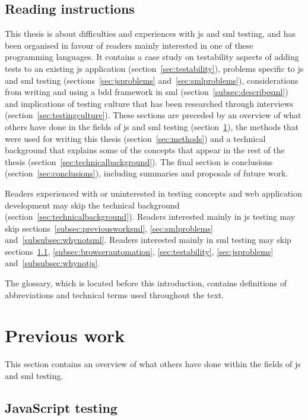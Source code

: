 \documentclass[11pt]{article}
\begin{document}
\subsection{Reading instructions}

This thesis is about difficulties and experiences with \gls{js} and \gls{sml} testing, and has been organised in favour of readers mainly interested in one of these programming languages. It contains a case study on testability aspects of adding tests to an existing \gls{js} application (section~\ref{sec:testability}), problems specific to \gls{js} and \gls{sml} testing (sections~\ref{sec:jsproblems} and~\ref{sec:smlproblems}), considerations from writing and using a \gls{bdd} framework in \gls{sml} (section~\ref{subsec:describesml}) and implications of testing culture that has been researched through interviews (section~\ref{sec:testingculture}). These sections are preceded by an overview of what others have done in the fields of \gls{js} and \gls{sml} testing (section~\ref{sec:previouswork}), the methods that were used for writing this thesis (section~\ref{sec:methods}) and a technical background that explains some of the concepts that appear in the rest of the thesis (section~\ref{sec:technicalbackground}). The final section is conclusions (section~\ref{sec:conclusions}), including summaries and proposals of future work.

Readers experienced with or uninterested in testing concepts and web application development may skip the technical background (section~\ref{sec:technicalbackground}). Readers interested mainly in \gls{js} testing may skip sections~\ref{subsec:previousworksml}, \ref{sec:smlproblems} and~\ref{subsubsec:whynotsml}. Readers interested mainly in \gls{sml} testing may skip sections~\ref{subsec:previousworkjs}, \ref{subsec:browserautomation}, \ref{sec:testability}, \ref{sec:jsproblems} and~\ref{subsubsec:whynotjs}.

The glossary, which is located before this introduction, contains definitions of abbreviations and technical terms used throughout the text.

\section{Previous work}
\label{sec:previouswork}

This section contains an overview of what others have done within the fields of \gls{js} and \gls{sml} testing.

\subsection{JavaScript testing}
\label{subsec:previousworkjs}
\end{document}
